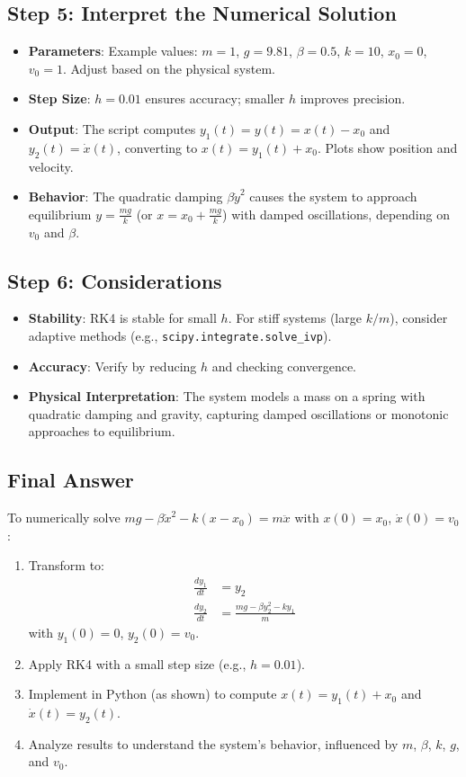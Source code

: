 \documentclass[a4paper,12pt]{article}
\begin{document}
\subsection*{Step 5: Interpret the Numerical Solution}
\begin{itemize}
    \item \textbf{Parameters}: Example values: \(m = 1\), \(g = 9.81\), \(\beta = 0.5\), \(k = 10\), \(x_0 = 0\), \(v_0 = 1\). Adjust based on the physical system.
    \item \textbf{Step Size}: \(h = 0.01\) ensures accuracy; smaller \(h\) improves precision.
    \item \textbf{Output}: The script computes \(y_1(t) = y(t) = x(t) - x_0\) and \(y_2(t) = \dot{x}(t)\), converting to \(x(t) = y_1(t) + x_0\). Plots show position and velocity.
    \item \textbf{Behavior}: The quadratic damping \(\beta \dot{y}^2\) causes the system to approach equilibrium \(y = \frac{mg}{k}\) (or \(x = x_0 + \frac{mg}{k}\)) with damped oscillations, depending on \(v_0\) and \(\beta\).
\end{itemize}

\subsection*{Step 6: Considerations}
\begin{itemize}
    \item \textbf{Stability}: RK4 is stable for small \(h\). For stiff systems (large \(k/m\)), consider adaptive methods (e.g., \texttt{scipy.integrate.solve\_ivp}).
    \item \textbf{Accuracy}: Verify by reducing \(h\) and checking convergence.
    \item \textbf{Physical Interpretation}: The system models a mass on a spring with quadratic damping and gravity, capturing damped oscillations or monotonic approaches to equilibrium.
\end{itemize}

\subsection*{Final Answer}
To numerically solve \(mg - \beta \dot{x}^2 - k(x - x_0) = m \ddot{x}\) with \(x(0) = x_0\), \(\dot{x}(0) = v_0\):
\begin{enumerate}
    \item Transform to:
    \begin{align}
    \frac{dy_1}{dt} &= y_2 \\
    \frac{dy_2}{dt} &= \frac{mg - \beta y_2^2 - k y_1}{m}
    \end{align}
    with \(y_1(0) = 0\), \(y_2(0) = v_0\).
    \item Apply RK4 with a small step size (e.g., \(h = 0.01\)).
    \item Implement in Python (as shown) to compute \(x(t) = y_1(t) + x_0\) and \(\dot{x}(t) = y_2(t)\).
    \item Analyze results to understand the system’s behavior, influenced by \(m\), \(\beta\), \(k\), \(g\), and \(v_0\).
\end{enumerate}

\end{document}
